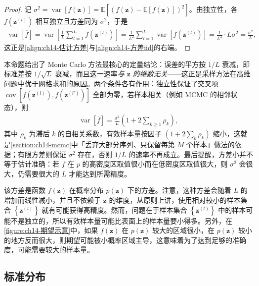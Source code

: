 \documentclass[../../main.tex]{subfiles}
\begin{document}
\begin{proof}
记 $\sigma^{2}=\operatorname{var}[f(\bm{z})]=\mathbb{E}\left[\left(f(\bm{z})-\mathbb{E}[f(\bm{z})]\right)^{2}\right]$。由独立性，各 $f(\bm{z}^{(l)})$ 相互独立且方差同为 $\sigma^{2}$，于是
\begin{align*}
\operatorname{var}\left[\overline{f}\right]=\operatorname{var}\left[\frac{1}{L}\sum_{l=1}^{L}f\!\left(\bm{z}^{(l)}\right)\right]=\frac{1}{L^{2}}\sum_{l=1}^{L}\operatorname{var}\left[f\!\left(\bm{z}^{(l)}\right)\right]=\frac{1}{L^{2}}\cdot L\sigma^{2}=\frac{\sigma^{2}}{L},
\end{align*}
这正是\eqref{align:ch14-估计方差}与\eqref{align:ch14-方差iid}的右端。
\end{proof}

\begin{remark}本命题给出了 Monte Carlo 方法最核心的定量结论：误差的平方按 $1/L$ 衰减，即标准差按 $1/\sqrt{L}$ 衰减，而且这一速率\emph{与 $\bm{z}$ 的维数无关}——这正是采样方法在高维问题中优于网格求和的原因。两个条件各有作用：独立性保证了交叉项 $\operatorname{cov}[f(\bm{z}^{(l)}),f(\bm{z}^{(l')})]$ 全部为零，若样本相关（例如 MCMC 的相邻状态），则
\begin{align*}
\operatorname{var}\left[\overline{f}\right]=\frac{\sigma^{2}}{L}\left(1+2\sum_{k\geqslant1}\rho_k\right),
\end{align*}
其中 $\rho_k$ 为滞后 $k$ 的自相关系数，有效样本量按因子 $\left(1+2\sum_k\rho_k\right)$ 缩小，这就是\cref{section:ch14-mcmc}中「丢弃大部分序列、只保留每第 $M$ 个样本」做法的依据；有限方差则保证 $\sigma^{2}$ 存在，否则 $1/L$ 的速率不再成立。最后提醒，方差小并不等于估计准确：若 $f$ 在 $p$ 的高密度区取值很小而在低密度区取值很大，则 $\sigma^{2}$ 会很大，仍需要很大的 $L$ 才能达到所需精度。
\end{remark}

该方差是函数 $f(\bm{z})$ 在概率分布 $p(\bm{z})$ 下的方差。注意，这种方差会随着 $L$ 的增加而线性减小，并且不依赖于 $\bm{z}$ 的维度，从原则上讲，使用相对较小的样本集合 $\left\{\bm{z}^{(l)}\right\}$ 就有可能获得高精度。然而，问题在于样本集合 $\left\{\bm{z}^{(l)}\right\}$ 中的样本可能不是独立的，所以有效样本量可能比表面上的样本量要小得多。另外，在\cref{figure:ch14-期望示意}中，如果 $f(\bm{z})$ 在 $p(\bm{z})$ 较大的区域很小，在 $p(\bm{z})$ 较小的地方反而很大，则期望可能被小概率区域主导，这意味着为了达到足够的准确度，可能需要较大的样本量。

\subsection{标准分布}\label{subsection:ch14-标准分布}
\end{document}
